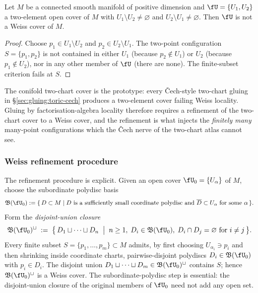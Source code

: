 \begin{proposition}
\label{prop:two-chart-not-weiss}
Let $M$ be a connected smooth manifold of positive dimension and
$\fU = \{U_1, U_2\}$ a two-element open cover of $M$ with
$U_1 \setminus U_2 \neq \varnothing$ and $U_2 \setminus U_1 \neq
\varnothing$. Then $\fU$ is not a Weiss cover of $M$.
\end{proposition}

\begin{proof}
Choose $p_1 \in U_1 \setminus U_2$ and $p_2 \in U_2 \setminus U_1$.
The two-point configuration $S = \{p_1, p_2\}$ is not contained in
either $U_1$ (because $p_2 \notin U_1$) or $U_2$ (because $p_1 \notin
U_2$), nor in any other member of $\fU$ (there are none). The
finite-subset criterion fails at $S$.
\end{proof}

The conifold two-chart cover is the prototype: every Čech-style
two-chart gluing in \S\ref{sec:gluing:toric-cech} produces a two-element cover failing Weiss
locality. Gluing by factorisation-algebra locality therefore requires
a refinement of the two-chart cover to a Weiss cover, and the
refinement is what injects the \emph{finitely many} many-point
configurations which the Čech nerve of the two-chart atlas cannot see.

\subsubsection{Weiss refinement procedure}
\label{subsec:weiss-refinement}

The refinement procedure is explicit. Given an open cover $\fU_0 =
\{U_\alpha\}$ of $M$, choose the subordinate polydisc basis
\[
 \mathfrak B(\fU_0)
 :=
 \{\,D\subset M \mid D \text{ is a sufficiently small coordinate
 polydisc and } \overline D\subset U_\alpha
 \text{ for some } \alpha\,\}.
\]
Form the \emph{disjoint-union closure}
\begin{equation}
\label{eq:weiss-refinement}
 \mathfrak B(\fU_0)^{\sqcup} \;:=\;
 \bigl\{\,
 D_1 \sqcup \cdots \sqcup D_n
 \;\bigm|\; n \ge 1,\; D_i \in \mathfrak B(\fU_0),\;
 D_i \cap D_j = \varnothing \text{ for } i \ne j
 \,\bigr\}.
\end{equation}
Every finite subset $S = \{p_1, \dots, p_m\} \subset M$ admits, by
first choosing $U_{\alpha_i}\ni p_i$ and then shrinking inside
coordinate charts, pairwise-disjoint polydiscs
$D_i\in\mathfrak B(\fU_0)$ with $p_i\in D_i$. The disjoint union
$D_1\sqcup\cdots\sqcup D_m\in\mathfrak B(\fU_0)^{\sqcup}$ contains
$S$; hence $\mathfrak B(\fU_0)^{\sqcup}$ is a Weiss cover. The
subordinate-polydisc step is essential: the disjoint-union closure of
the original members of $\fU_0$ need not add any open set.

